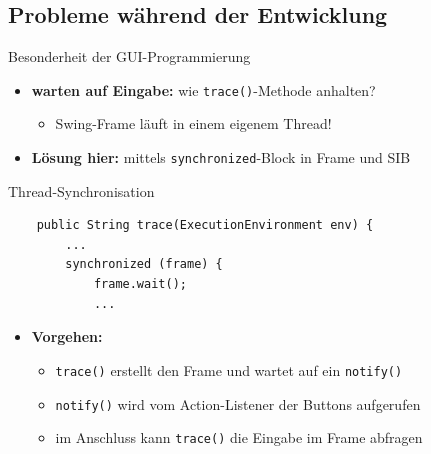 \subsection*{Probleme während der Entwicklung}
\begin{frame}[fragile]{Besonderheit der GUI-Programmierung}
\begin{itemize}
	\item \textbf{warten auf Eingabe:} wie \texttt{trace()}-Methode anhalten?
		\begin{itemize}
			\item Swing-Frame läuft in einem eigenem Thread!
		\end{itemize}
	\pause
	\item \textbf{Lösung hier:} mittels \texttt{synchronized}-Block in Frame und SIB
\end{itemize}

	\begin{block}{Thread-Synchronisation}
	\javalstset
	\begin{lstlisting}
	public String trace(ExecutionEnvironment env) {
		...
		synchronized (frame) {
			frame.wait();
			...
	\end{lstlisting}
	\end{block}

\begin{itemize}
	\item \textbf{Vorgehen:}
		\begin{itemize}
			\item \texttt{trace()} erstellt den Frame und wartet auf ein \texttt{notify()}
			\item \texttt{notify()} wird vom Action-Listener der Buttons aufgerufen
			\item im Anschluss kann \texttt{trace()} die Eingabe im Frame abfragen
		\end{itemize}
\end{itemize}
\end{frame}



